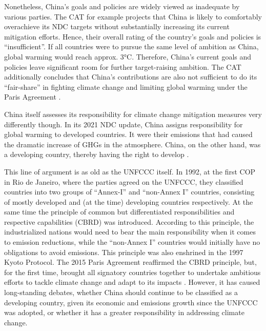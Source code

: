 \documentclass[
  12pt,
]{article}
\numberwithin{equation}{section}
\numberwithin{table}{section}
\numberwithin{figure}{section}
\begin{document}
Nonetheless, China's goals and policies are widely viewed as inadequate
by various parties. The CAT for example projects that China is likely to
comfortably overachieve its NDC targets without substantially increasing
its current mitigation efforts. Hence, their overall rating of the
country's goals and policies is ``insufficient''. If all countries were
to pursue the same level of ambition as China, global warming would
reach approx. 3°C. Therefore, China's current goals and policies leave
significant room for further target-raising ambition. The CAT
additionally concludes that China's contributions are also not
sufficient to do its ``fair-share'' in fighting climate change and
limiting global warming under the Paris Agreement \citep{CAT2022}.

China itself assesses its responsibility for climate change mitigation
measures very differently though. In its 2021 NDC update, China assigns
responsibility for global warming to developed countries. It were their
emissions that had caused the dramatic increase of GHGs in the
atmosphere. China, on the other hand, was a developing country, thereby
having the right to develop \citep{China2022}.

This line of argument is as old as the UNFCCC itself. In 1992, at the
first COP in Rio de Janeiro, where the parties agreed on the UNFCCC,
they classified countries into two groups of ``Annex-I'' and ``non-Annex
I'' countries, consisting of mostly developed and (at the time)
developing countries respectively. At the same time the principle of
common but differentiated responsibilities and respective capabilities
(CBRD) was introduced. According to this principle, the industrialized
nations would need to bear the main responsibility when it comes to
emission reductions, while the ``non-Annex I'' countries would initially
have no obligations to avoid emissions. This principle was also
enshrined in the 1997 Kyoto Protocol. The 2015 Paris Agreement
reaffirmed the CBRD principle, but, for the first time, brought all
signatory countries together to undertake ambitious efforts to tackle
climate change and adapt to its impacts \citep{UNFCCC2015}. However, it
has caused long-standing debates, whether China should continue to be
classified as a developing country, given its economic and emissions
growth since the UNFCCC was adopted, or whether it has a greater
responsibility in addressing climate change.
\end{document}
